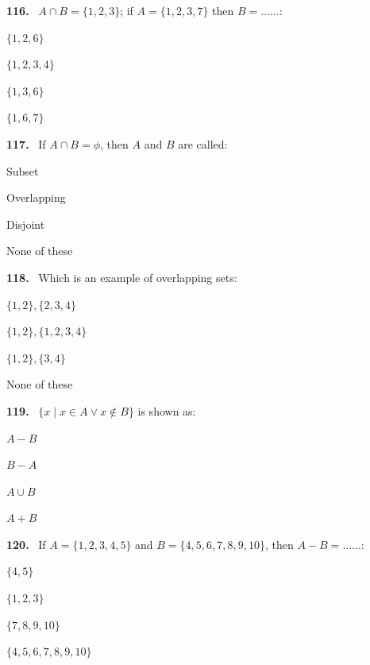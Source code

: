 \documentclass[11pt]{article}
\newenvironment{qenv}[1]{%
  \par\medskip\noindent\textbf{#1.}\ \ignorespaces
}{\par}
\begin{document}
\begin{qenv}{116} $A\cap B=\{1,2,3\}$; if $A=\{1,2,3,7\}$ then $B = \ldots\ldots$:
\begin{options} \item $\{1,2,6\}$ \item $\{1,2,3,4\}$ \item $\{1,3,6\}$ \item $\{1,6,7\}$ \end{options} \end{qenv}

\begin{qenv}{117} If $A\cap B=\phi$, then $A$ and $B$ are called:
\begin{options} \item Subset \item Overlapping \item Disjoint \item None of these \end{options} \end{qenv}

\begin{qenv}{118} Which is an example of overlapping sets:
\begin{options} \item $\{1,2\},\{2,3,4\}$ \item $\{1,2\},\{1,2,3,4\}$ \item $\{1,2\},\{3,4\}$ \item None of these \end{options} \end{qenv}

\begin{qenv}{119} $\{x \mid x\in A \lor x\notin B\}$ is shown as:
\begin{options} \item $A-B$ \item $B-A$ \item $A\cup B$ \item $A+B$ \end{options} \end{qenv}

\begin{qenv}{120} If $A=\{1,2,3,4,5\}$ and $B=\{4,5,6,7,8,9,10\}$, then $A-B = \ldots\ldots$:
\begin{options} \item $\{4,5\}$ \item $\{1,2,3\}$ \item $\{7,8,9,10\}$ \item $\{4,5,6,7,8,9,10\}$ \end{options} \end{qenv}
\end{document}
